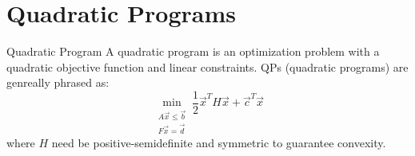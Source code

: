 \section{Quadratic Programs}
\begin{ln-define}{Quadratic Program}{}
    A quadratic program is an optimization problem with a quadratic objective function and linear constraints.
    \tcblower
    QPs (quadratic programs) are genreally phrased as:
    \[
        \min_{
            \substack{
                A \vec{x} \leq \vec{b} \\
                F \vec{x} = \vec{d}
            }
        } \frac{1}{2} \vec{x}^T H \vec{x} + \vec{c}^T \vec{x}
    \]
    where $H$ need be positive-semidefinite and symmetric to guarantee convexity.
\end{ln-define}

